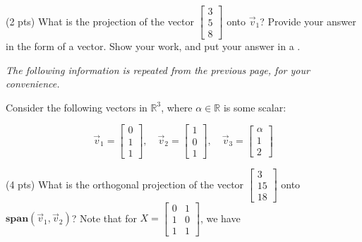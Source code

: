 \documentclass[twoside,12pt]{article}
\newcommand{\suraj}[1]{{\color{blue}[{\bf Suraj}: #1]}}
\begin{document}
\begin{probset}
\begin{prob}
\begin{subprobset}
    \vspace{0.3cm}
    \begin{subprob}(2 pts)
        What is the projection of the vector $\begin{bmatrix}
3 \\
5 \\
8
\end{bmatrix}$ onto $\vec{v}_1$? Provide your answer in the form of a vector. Show your work, and put your answer in a . 

    \begin{responsebox}{3in}
        
    \end{responsebox}
    \end{subprob} 

\end{subprobset}
\newpage
\textit{The following information is repeated from the previous page, for your convenience.} 

Consider the following vectors in \( \mathbb{R}^3 \), where $\alpha \in \mathbb{R}$ is some scalar:

\[
\vec{v}_1 = \begin{bmatrix} 0 \\ 1 \\ 1 \end{bmatrix}, \quad 
\vec{v}_2 = \begin{bmatrix} 1 \\ 0 \\ 1 \end{bmatrix}, \quad 
\vec{v}_3 = \begin{bmatrix} \alpha \\ 1 \\ 2 \end{bmatrix}
            \]
\begin{subprobset}
\begin{subprob}(4 pts)
        What is the orthogonal projection of the vector $\begin{bmatrix}
3 \\
15 \\
18
\end{bmatrix}$ onto $\textbf{span}(\vec{v}_1, \vec{v}_2)$? Note that for $X = \begin{bmatrix}
            0 & 1 \\ 1 & 0 \\ 1 & 1
        \end{bmatrix}$, we have 


\end{subprob}
\end{subprobset}
\end{prob}
\end{probset}
\end{document}
